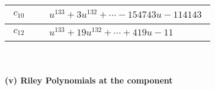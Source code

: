 \documentclass[1p]{elsarticle_modified}
\theoremstyle{definition}
\begin{document}
\begin{tabular}{m{50pt}|m{274pt}}
\hline $$\begin{aligned}c_{10}\end{aligned}$$&$\begin{aligned}
&u^{133}+3 u^{132}+\cdots-154743 u-114143
\end{aligned}$\\
\hline $$\begin{aligned}c_{12}\end{aligned}$$&$\begin{aligned}
&u^{133}+19 u^{132}+\cdots+419 u-11
\end{aligned}$\\
\hline
\end{tabular}\\~\\
\newpage\renewcommand{\arraystretch}{1}
\flushleft \textbf{(v) Riley Polynomials at the component}\newline \\
\end{document}
